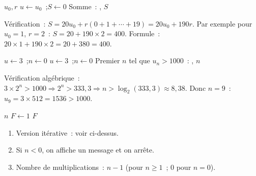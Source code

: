
\begin{algorithm}[H]
\caption{Suite arithm\'etique et somme}
\Lire $u_0, r$\;
$u \leftarrow u_0$~;\quad $S \leftarrow 0$\;
\Afficher \og Somme~: \fg, $S$\;
\end{algorithm}

V\'erification~: $S = 20u_0 + r(0+1+\cdots+19)=20u_0+190r$.
Par exemple pour $u_0=1$, $r=2$~: $S=20+190\times2=400$.
Formule~: $20\times1+190\times2=20+380=400$.\checkmark


\begin{algorithm}[H]
\caption{Suite g\'eom\'etrique $u_n=3\times2^n$}
$u \leftarrow 3$~;\quad $n \leftarrow 0$\;
$u \leftarrow 3$~;\quad $n \leftarrow 0$\;
\Afficher \og Premier $n$ tel que $u_n>1000$~: \fg, $n$\;
\end{algorithm}

V\'erification alg\'ebrique~: $3\times2^n>1000\Rightarrow2^n>333{,}3\Rightarrow n>\log_2(333{,}3)\approx8{,}38$.
Donc $n=9$~: $u_9=3\times512=1536>1000$.\checkmark


\begin{algorithm}[H]
\caption{Factorielle}
\Lire $n$\;
$F \leftarrow 1$\;
\Afficher $F$\;
\end{algorithm}

\begin{enumerate}
  \item Version it\'erative~: voir ci-dessus.
  \item Si $n<0$, on affiche un message et on arr\^ete.
  \item Nombre de multiplications~: $n-1$ (pour $n\geq1$~; $0$ pour $n=0$).
\end{enumerate}

